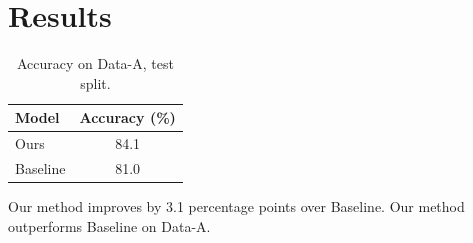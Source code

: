 \section{Results}
\begin{table}
\centering
\begin{tabular}{lc}
\toprule
Model & Accuracy (\%) \\
\midrule
Ours & 84.1 \\
Baseline & 81.0 \\
\bottomrule
\end{tabular}
\caption{Accuracy on Data-A, test split.}
\label{tab:main}
\end{table}

Our method improves by 3.1 percentage points over Baseline.
Our method outperforms Baseline on Data-A.


